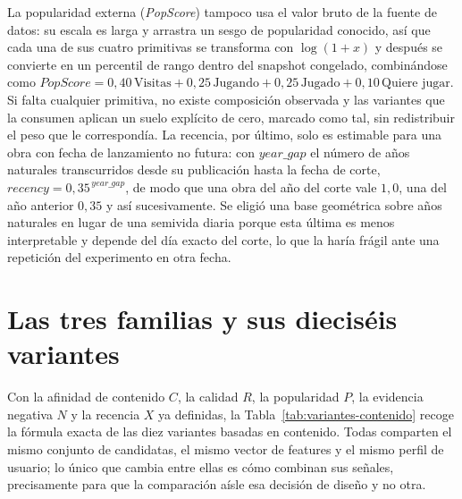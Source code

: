 La popularidad externa (\emph{PopScore}) tampoco usa el valor bruto de la fuente de datos: su
escala es larga y arrastra un sesgo de popularidad conocido, así que cada una de sus cuatro
primitivas se transforma con \(\log(1+x)\) y después se convierte en un percentil de rango
dentro del snapshot congelado, combinándose como \(PopScore = 0{,}40\,\text{Visitas} +
0{,}25\,\text{Jugando} + 0{,}25\,\text{Jugado} + 0{,}10\,\text{Quiere jugar}\). Si falta
cualquier primitiva, no existe composición observada y las variantes que la consumen aplican un
suelo explícito de cero, marcado como tal, sin redistribuir el peso que le correspondía. La
recencia, por último, solo es estimable para una obra con fecha de lanzamiento no futura: con
\(year\_gap\) el número de años naturales transcurridos desde su publicación hasta la fecha de
corte, \(recency = 0{,}35^{\,year\_gap}\), de modo que una obra del año del corte vale
\(1{,}0\), una del año anterior \(0{,}35\) y así sucesivamente. Se eligió una base geométrica
sobre años naturales en lugar de una semivida diaria porque esta última es menos interpretable
y depende del día exacto del corte, lo que la haría frágil ante una repetición del experimento
en otra fecha.

\section{Las tres familias y sus dieciséis variantes}\label{sec:alg-familias}

Con la afinidad de contenido \(C\), la calidad \(R\), la popularidad \(P\), la evidencia
negativa \(N\) y la recencia \(X\) ya definidas, la Tabla~\ref{tab:variantes-contenido} recoge
la fórmula exacta de las diez variantes basadas en contenido. Todas comparten el mismo conjunto
de candidatas, el mismo vector de features y el mismo perfil de usuario; lo único que cambia
entre ellas es cómo combinan sus señales, precisamente para que la comparación aísle esa
decisión de diseño y no otra.


